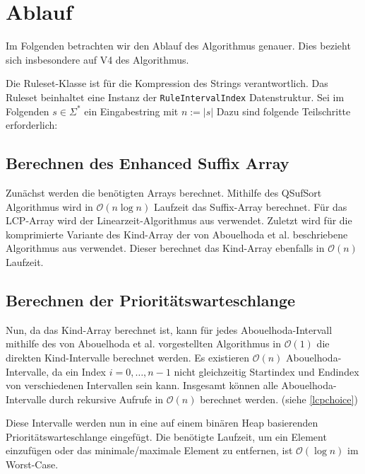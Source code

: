 \section{Ablauf}

Im Folgenden betrachten wir den Ablauf des Algorithmus genauer. Dies bezieht sich insbesondere auf V4 des Algorithmus.

Die Ruleset-Klasse ist für die Kompression des Strings verantwortlich. Das Ruleset beinhaltet eine Instanz der \texttt{RuleIntervalIndex} Datenstruktur. Sei im Folgenden $s \in \Sigma^*$ ein Eingabestring mit $n := |s|$ Dazu sind folgende Teilschritte erforderlich:

\subsection{Berechnen des Enhanced Suffix Array}

Zunächst werden die benötigten Arrays berechnet. Mithilfe des QSufSort Algorithmus \cite{larsson_faster_2007} wird in $\mathcal{O}(n \log n)$ Laufzeit das Suffix-Array berechnet. Für das LCP-Array wird der Linearzeit-Algorithmus aus \cite{kasai_linear-time_2001} verwendet. Zuletzt wird für die komprimierte Variante des Kind-Array der von Abouelhoda et al. beschriebene Algorithmus aus \cite{abouelhoda_optimal_2002} verwendet. Dieser berechnet das Kind-Array ebenfalls in $\mathcal{O}(n)$ Laufzeit.

\subsection{Berechnen der Prioritätswarteschlange}
\label{calcqueue}

Nun, da das Kind-Array berechnet ist, kann für jedes Abouelhoda-Intervall mithilfe des von Abouelhoda et al. vorgestellten Algorithmus in $\mathcal{O}(1)$ die direkten Kind-Intervalle berechnet werden. Es existieren $\mathcal{O}(n)$ Abouelhoda-Intervalle, da ein Index $i = 0,\dots,n - 1$ nicht gleichzeitig Startindex und Endindex von verschiedenen Intervallen sein kann. Insgesamt können alle Abouelhoda-Intervalle durch rekursive Aufrufe in $\mathcal{O}(n)$ berechnet werden. (siehe \autoref{lcpchoice})

Diese Intervalle werden nun in eine auf einem binären Heap \cite{williams_algorithm_1964} basierenden Prioritätswarteschlange eingefügt. Die benötigte Laufzeit, um ein Element einzufügen oder das minimale/maximale Element zu entfernen, ist $\mathcal{O}(\log n)$ im Worst-Case.

